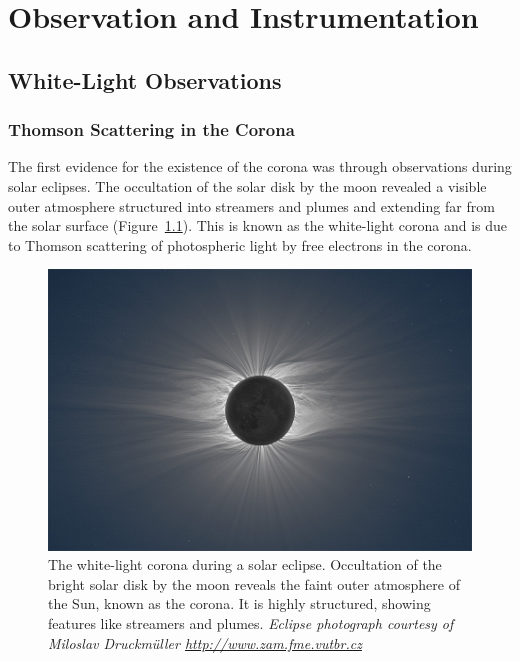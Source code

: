 

\chapter{Observation and Instrumentation} 
\label{chap:3}

\section{White-Light Observations}\label{sec:1}

\subsection{Thomson Scattering in the Corona}\label{sec:10}

The first evidence for the existence of the corona was through observations during solar eclipses. The occultation of the solar disk by the moon revealed a visible outer atmosphere structured into streamers and plumes and extending far from the solar surface (Figure~\ref{fig:eclipse}). This is known as the white-light corona and is due to Thomson scattering of photospheric light by free electrons in the corona.
\begin{figure}[t!]
\begin{center}
\includegraphics[scale=0.45]{images/solar_eclipse}
\caption[White-light corona during an eclipse]{The white-light corona during a solar eclipse. Occultation of the bright solar disk by the moon reveals the faint outer atmosphere of the Sun, known as the corona. It is highly structured, showing features like streamers and plumes. {\it Eclipse photograph courtesy of Miloslav Druckm\"{u}ller \href{http://www.zam.fme.vutbr.cz/~druck/Index.htm}{http://www.zam.fme.vutbr.cz}}}
\label{fig:eclipse}
\end{center}
\end{figure}

